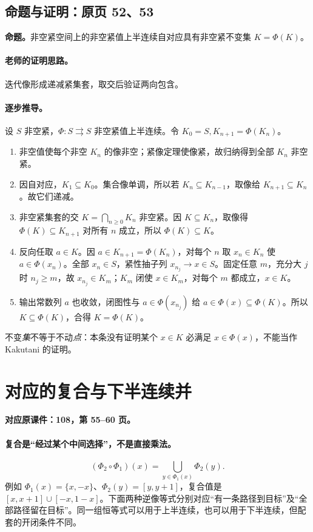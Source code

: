 \subsection{命题与证明：原页 52、53}

\textbf{命题。}非空紧空间上的非空紧值上半连续自对应具有非空紧不变集 $K=\Phi(K)$。

\paragraph{老师的证明思路。}迭代像形成递减紧集套，取交后验证两向包含。

\paragraph{逐步推导。}
设 $S$ 非空紧，$\Phi:S\rightrightarrows S$ 非空紧值上半连续。令 $K_0=S,K_{n+1}=\Phi(K_n)$。
\begin{enumerate}
\item 非空值使每个非空 $K_n$ 的像非空；紧像定理使像紧，故归纳得到全部 $K_n$ 非空紧。
\item 因自对应，$K_1\subseteq K_0$。集合像单调，所以若 $K_n\subseteq K_{n-1}$，取像给 $K_{n+1}\subseteq K_n$。故它们递减。
\item 非空紧集套的交 $K=\bigcap_{n\ge0}K_n$ 非空紧。因 $K\subseteq K_n$，取像得 $\Phi(K)\subseteq K_{n+1}$ 对所有 $n$ 成立，所以 $\Phi(K)\subseteq K$。
\item 反向任取 $a\in K$。因 $a\in K_{n+1}=\Phi(K_n)$，对每个 $n$ 取 $x_n\in K_n$ 使 $a\in\Phi(x_n)$。全部 $x_n\in S$，紧性抽子列 $x_{n_j}\to x\in S$。固定任意 $m$，充分大 $j$ 时 $n_j\ge m$，故 $x_{n_j}\in K_m$；$K_m$ 闭使 $x\in K_m$，对每个 $m$ 都成立，$x\in K$。
\item 输出常数列 $a$ 也收敛，闭图性与 $a\in\Phi(x_{n_j})$ 给 $a\in\Phi(x)\subseteq\Phi(K)$。所以 $K\subseteq\Phi(K)$，合得 $K=\Phi(K)$。
\end{enumerate}
不变\emph{集}不等于不动\emph{点}：本条没有证明某个 $x\in K$ 必满足 $x\in\Phi(x)$，不能当作 Kakutani 的证明。


\clearpage\section{对应的复合与下半连续并}\label{g:108:55}

\textbf{对应原课件：108，第 55--60 页。}


\paragraph{复合是“经过某个中间选择”，不是直接乘法。}
\[(\Phi_2\circ\Phi_1)(x)=\bigcup_{y\in\Phi_1(x)}\Phi_2(y).
\]
例如 $\Phi_1(x)=\{x,-x\}$、$\Phi_2(y)=[y,y+1]$，复合值是 $[x,x+1]\cup[-x,1-x]$。下面两种逆像等式分别对应“有一条路径到目标”及“全部路径留在目标”。同一组恒等式可以用于上半连续，也可以用于下半连续，但配套的开闭条件不同。


